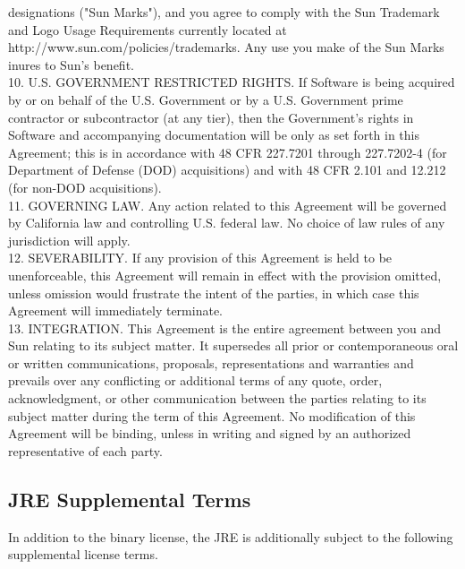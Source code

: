 {   designations ("Sun Marks"), and you agree to comply with the Sun
   Trademark and Logo Usage Requirements currently located at
   http://www.sun.com/policies/trademarks. Any use you make of the Sun
   Marks inures to Sun's benefit.
\\[4pt]
  10. U.S. GOVERNMENT RESTRICTED RIGHTS. If Software is being acquired
  by or on behalf of the U.S. Government or by a U.S. Government prime
  contractor or subcontractor (at any tier), then the Government's
  rights in Software and accompanying documentation will be only as
  set forth in this Agreement; this is in accordance with 48 CFR
  227.7201 through 227.7202-4 (for Department of Defense (DOD)
  acquisitions) and with 48 CFR 2.101 and 12.212 (for non-DOD
  acquisitions).
\\[4pt]
  11. GOVERNING LAW. Any action related to this Agreement will be
  governed by California law and controlling U.S. federal law. No
  choice of law rules of any jurisdiction will apply.
\\[4pt]
  12. SEVERABILITY. If any provision of this Agreement is held to be
  unenforceable, this Agreement will remain in effect with the
  provision omitted, unless omission would frustrate the intent of the
  parties, in which case this Agreement will immediately terminate.
\\[4pt]
  13. INTEGRATION. This Agreement is the entire agreement between you
  and Sun relating to its subject matter. It supersedes all prior or
  contemporaneous oral or written communications, proposals,
  representations and warranties and prevails over any conflicting or
  additional terms of any quote, order, acknowledgment, or other
  communication between the parties relating to its subject matter
  during the term of this Agreement. No modification of this Agreement
  will be binding, unless in writing and signed by an authorized
  representative of each party.
}

\subsection{JRE Supplemental Terms}

\setlength{\baselineskip}{\oldbaselineskip}
\noindent
In addition to the binary license, the JRE is additionally subject to
the following supplemental license terms.
\\

